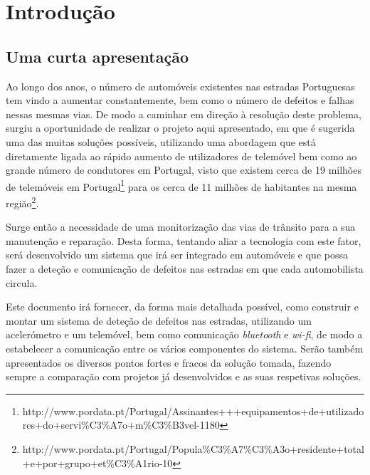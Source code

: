 \newcommand{\unlthesis}{\emph{unlthesis}}
\newcommand{\unlthesisclass}{\texttt{unlthesis.cls}}


\chapter{Introdução}
\label{cha:introdução}


\section{Uma curta apresentação} %
\label{sec:uma_curta_apresentação}

Ao longo dos anos, o número de automóveis existentes nas estradas Portuguesas tem vindo a aumentar constantemente, bem como o número de defeitos e falhas nessas mesmas vias. De modo a caminhar em direção à resolução deste problema, surgiu a oportunidade de realizar o projeto aqui apresentado, em que é sugerida uma das muitas soluções possíveis, utilizando uma abordagem que está diretamente ligada ao rápido aumento de utilizadores de telemóvel bem como ao grande número de condutores em Portugal, visto que existem cerca de 19 milhões de telemóveis em Portugal\footnote{http://www.pordata.pt/Portugal/Assinantes+++equipamentos+de+utilizadores+do+servi\%C3\%A7o+m\%C3\%B3vel-1180} para os cerca de 11 milhões de habitantes na mesma região\footnote{http://www.pordata.pt/Portugal/Popula\%C3\%A7\%C3\%A3o+residente+total+e+por+grupo+et\%C3\%A1rio-10}.

Surge então a necessidade de uma monitorização das vias de trânsito para a sua manutenção e reparação. Desta forma, tentando aliar a tecnologia com este fator, será desenvolvido um sistema que irá ser integrado em automóveis e que possa fazer a deteção e comunicação de defeitos nas estradas em que cada automobilista circula.

Este documento irá fornecer, da forma mais detalhada possível, como construir e montar um sistema de deteção de defeitos nas estradas, utilizando um acelerómetro e um telemóvel, bem como comunicação \emph{bluetooth} e \emph{wi-fi}, de modo a estabelecer a comunicação entre os vários componentes do sistema. Serão também apresentados os diversos pontos fortes e fracos da solução tomada, fazendo sempre a comparação com projetos já desenvolvidos e as suas respetivas soluções.

